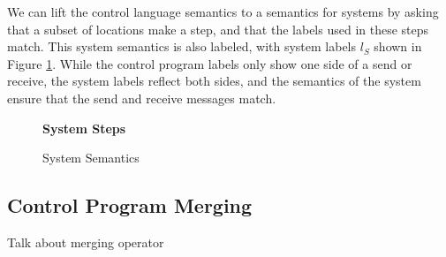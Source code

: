 We can lift the control language semantics to a semantics for systems by asking that a subset of locations make a step, and that the labels used in these steps match.
This system semantics is also labeled, with system labels $l_S$ shown in Figure \ref{fig:system-semantics}.
While the control program labels only show one side of a send or receive, the system labels reflect both sides, and the semantics of the system ensure that the send and receive messages match.

\begin{figure}
  \begin{syntax}
    \alternative{\iota} \alternative{\iotasync}   
  \end{syntax}
  \textbf{System Steps}
  \caption{System Semantics}
  \label{fig:system-semantics}
\end{figure}

\subsection{Control Program Merging}
\label{sec:control-merge}
\todo Talk about merging operator 


